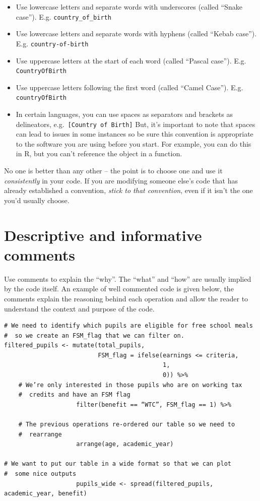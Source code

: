 \documentclass[
]{book}
\providecommand{\tightlist}{%
  \setlength{\itemsep}{0pt}\setlength{\parskip}{0pt}}
\begin{document}
\begin{itemize}
\tightlist
\item
  Use lowercase letters and separate words with underscores (called ``Snake case''). E.g. \texttt{country\_of\_birth}
\item
  Use lowercase letters and separate words with hyphens (called ``Kebab case''). E.g. \texttt{country-of-birth}
\item
  Use uppercase letters at the start of each word (called ``Pascal case''). E.g. \texttt{CountryOfBirth}
\item
  Use uppercase letters following the first word (called ``Camel Case''). E.g. \texttt{countryOfBirth}
\item
  In certain languages, you can use spaces as separators and brackets as delineators, e.g.~\texttt{{[}Country\ of\ Birth{]}}
  But, it's important to note that spaces can lead to issues in some instances so be sure this convention is appropriate to the software you are using before you start. For example, you can do this in R, but you can't reference the object in a function.
\end{itemize}

No one is better than any other -- the point is to choose one and use it \emph{consistently} in your code. If you are modifying someone else's code that has already established a convention, \emph{stick to that convention}, even if it isn't the one you'd usually choose.

\hypertarget{descriptive-and-informative-comments}{%
\section{Descriptive and informative comments}\label{descriptive-and-informative-comments}}

Use comments to explain the ``why''. The ``what'' and ``how'' are usually implied by the code itself. An example of well commented code is given below, the comments explain the reasoning behind each operation and allow the reader to understand the context and purpose of the code.

\begin{verbatim}
# We need to identify which pupils are eligible for free school meals
#  so we create an FSM_flag that we can filter on. 
filtered_pupils <- mutate(total_pupils,
                          FSM_flag = ifelse(earnings <= criteria,
                                            1,
                                            0)) %>%
    # We’re only interested in those pupils who are on working tax
    #  credits and have an FSM flag
                    filter(benefit == “WTC”, FSM_flag == 1) %>%

    # The previous operations re-ordered our table so we need to 
    #  rearrange
                    arrange(age, academic_year)
        
# We want to put our table in a wide format so that we can plot 
#  some nice outputs
                    pupils_wide <- spread(filtered_pupils, academic_year, benefit)
\end{verbatim}
\end{document}
